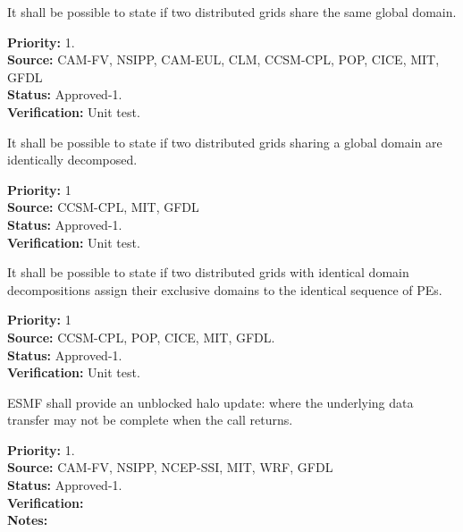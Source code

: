

It shall be possible to state if two distributed grids share the same
global domain.

\begin{reqlist}
{\bf Priority:} 1. \\ 
{\bf Source:} CAM-FV, NSIPP, CAM-EUL, CLM, CCSM-CPL, POP, CICE, MIT, GFDL \\
{\bf Status:} Approved-1. \\
{\bf Verification:} Unit test.
\end{reqlist}


It shall be possible to state if two distributed grids sharing a
global domain are identically decomposed.

\begin{reqlist}
{\bf Priority:} 1 \\ 
{\bf Source:} CCSM-CPL, MIT, GFDL \\
{\bf Status:} Approved-1. \\
{\bf Verification:} Unit test.
\end{reqlist}


It shall be possible to state if two distributed grids with identical
domain decompositions assign their exclusive domains to the
identical sequence of PEs.

\begin{reqlist}
{\bf Priority:} 1 \\
{\bf Source:} CCSM-CPL, POP, CICE, MIT, GFDL. \\
{\bf Status:} Approved-1. \\
{\bf Verification:} Unit test. 
\end{reqlist}

 \label{DG:halo}



ESMF shall provide an unblocked halo update: where the underlying
data transfer may not be complete when the call returns.

\begin{reqlist}
{\bf Priority:} 1. \\ 
{\bf Source:} CAM-FV, NSIPP, NCEP-SSI, MIT, WRF, GFDL \\
{\bf Status:} Approved-1. \\
{\bf Verification:} \\
{\bf Notes:}
\end{reqlist}

